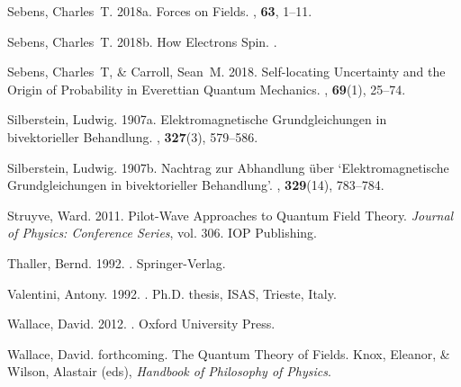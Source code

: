 \documentclass[12pt,secnumarabic,amsmath,amssymb,balancelastpage,nofootinbib]{article}
\begin{document}
\begin{thebibliography}{}
Sebens, Charles~T. 2018a.
\newblock Forces on Fields.
, {\bf 63},
  1--11.

Sebens, Charles~T. 2018b.
\newblock How Electrons Spin.
.

Sebens, Charles~T, \& Carroll, Sean~M. 2018.
\newblock Self-locating Uncertainty and the Origin of Probability in Everettian
  Quantum Mechanics.
, {\bf 69}(1),
  25--74.

Silberstein, Ludwig. 1907a.
\newblock Elektromagnetische Grundgleichungen in bivektorieller Behandlung.
, {\bf 327}(3), 579--586.

Silberstein, Ludwig. 1907b.
\newblock Nachtrag zur Abhandlung \"{u}ber `Elektromagnetische Grundgleichungen
  in bivektorieller Behandlung'.
, {\bf 329}(14), 783--784.

Struyve, Ward. 2011.
\newblock Pilot-Wave Approaches to Quantum Field Theory.
 {\em Journal of Physics: Conference Series},
  vol. 306.
\newblock IOP Publishing.

Thaller, Bernd. 1992.
.
\newblock Springer-Verlag.

Valentini, Antony. 1992.
.
\newblock Ph.D. thesis, ISAS, Trieste, Italy.

Wallace, David. 2012.
.
\newblock Oxford University Press.

Wallace, David. forthcoming.
\newblock The Quantum Theory of Fields.
 Knox, Eleanor, \& Wilson, Alastair (eds), {\em Handbook of
  Philosophy of Physics}.


\end{thebibliography}
\end{document}
